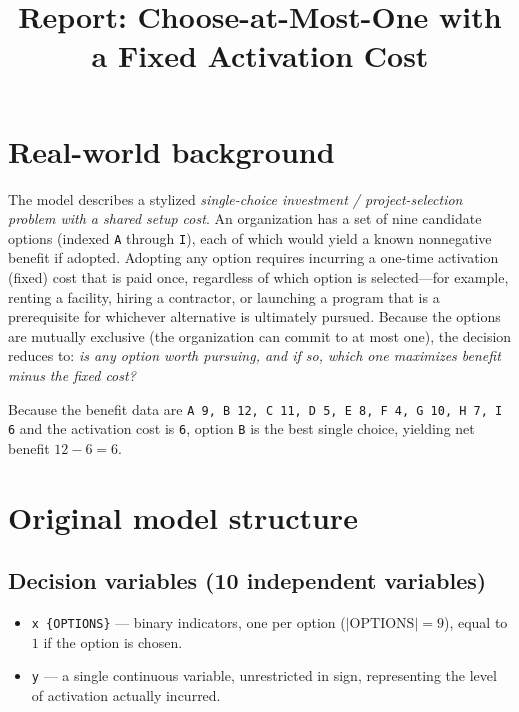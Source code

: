 \documentclass{article}
\title{Report: Choose-at-Most-One with a Fixed Activation Cost}
\author{}
\date{}
\begin{document}
\maketitle

\section{Real-world background}

The model describes a stylized \emph{single-choice investment / project-selection problem with a shared setup cost}. An organization has a set of nine candidate options (indexed \texttt{A} through \texttt{I}), each of which would yield a known nonnegative benefit if adopted. Adopting any option requires incurring a one-time activation (fixed) cost that is paid once, regardless of which option is selected---for example, renting a facility, hiring a contractor, or launching a program that is a prerequisite for whichever alternative is ultimately pursued. Because the options are mutually exclusive (the organization can commit to at most one), the decision reduces to: \emph{is any option worth pursuing, and if so, which one maximizes benefit minus the fixed cost?}

Because the benefit data are \texttt{A 9, B 12, C 11, D 5, E 8, F 4, G 10, H 7, I 6} and the activation cost is \texttt{6}, option \texttt{B} is the best single choice, yielding net benefit \(12-6=6\).

\section{Original model structure}

\subsection*{Decision variables (10 independent variables)}
\begin{itemize}
  \item \texttt{x \{OPTIONS\}} --- binary indicators, one per option (\(\lvert\mathrm{OPTIONS}\rvert=9\)), equal to \(1\) if the option is chosen.
  \item \texttt{y} --- a single continuous variable, unrestricted in sign, representing the level of activation actually incurred.
\end{itemize}
\end{document}
